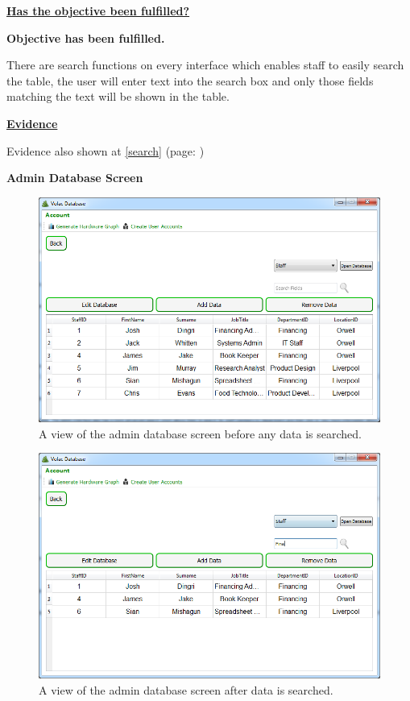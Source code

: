 \underline{\textbf{Has the objective been fulfilled?}}

\textbf{Objective has been fulfilled.}

There are search functions on every interface which enables staff to easily search the table, the user will enter text into the search box and only those fields matching the text will be shown in the table.

\underline{\textbf{Evidence}}

Evidence also shown at \ref{search} (page: \pageref{search})

\textbf{Admin Database Screen}

\begin{figure}[H]
    \includegraphics[width=\textwidth]{./Evaluation/Images/beforeadminsearch.png}
    \caption{A view of the admin database screen before any data is searched.} 
\end{figure}

\begin{figure}[H]
    \includegraphics[width=\textwidth]{./Evaluation/Images/afteradminsearch.png}
    \caption{A view of the admin database screen after data is searched.} 
\end{figure}

